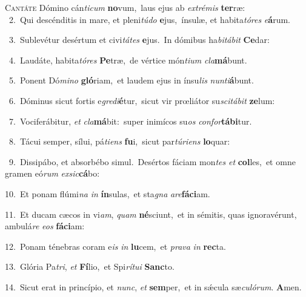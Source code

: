 \lettrine{\initial\textcolor{\initialcolor}{C}}{antáte} Dómino cán\-\textit{ti}\-\textit{cum} \textbf{no}\-vum,~\star laus ejus ab \textit{ex}\-\textit{tré}\textit{mis} \textbf{ter}\-ræ:\\
{\numbfont\textcolor{\numbcolor}{~2.}}~Qui descénditis in mare, et pleni\-\textit{tú}\-\textit{do} \textbf{e}\-jus,~\star ínsulæ, et habita\-\textit{tó}\-\textit{res} \textit{e}\-\textbf{á}rum.\par
{\numbfont\textcolor{\numbcolor}{~3.}}~Sublevétur desértum et civi\-\textit{tá}\-\textit{tes} \textbf{e}\-jus.~\star In dómibus ha\-\textit{bi}\-\textit{tá}\textit{bit} \textbf{Ce}\-dar:\par
{\numbfont\textcolor{\numbcolor}{~4.}}~Laudáte, habita\-\textit{tó}\-\textit{res} \textbf{Pe}\-træ,~\star de vértice món\-\textit{ti}\-\textit{um} \textit{cla}\-\textbf{má}bunt.\par
{\numbfont\textcolor{\numbcolor}{~5.}}~Ponent Dó\-\textit{mi}\-\textit{no} \textbf{gló}\-riam,~\star et laudem ejus in ínsu\textit{lis} \textit{nun}\-\textit{ti}\textbf{á}bunt.\par
{\numbfont\textcolor{\numbcolor}{~6.}}~Dóminus sicut fortis e\-\textit{gre}\-\textit{di}\textbf{é}tur,~\star sicut vir prœliátor su\-\textit{sci}\-\textit{tá}\textit{bit} \textbf{ze}\-lum:\par
{\numbfont\textcolor{\numbcolor}{~7.}}~Vociferábitur, \textit{et} \textit{cla}\-\textbf{má}bit:~\star super inimícos su\textit{os} \textit{con}\-\textit{for}\textbf{tá}\textbf{bi}tur.\par
{\numbfont\textcolor{\numbcolor}{~8.}}~Tácui semper, sílui, pá\-\textit{ti}\-\textit{ens} \textbf{fu}\-i,~\star sicut par\-\textit{tú}\-\textit{ri}\textit{ens} \textbf{lo}\-quar:\par
{\numbfont\textcolor{\numbcolor}{~9.}}~Dissipábo, et absorbébo simul.~\dagger Desértos fáciam mon\textit{tes} \textit{et} \textbf{col}\-les,~\star et omne gramen eó\textit{rum} \textit{ex}\-\textit{sic}\textbf{cá}bo:\par
{\numbfont\textcolor{\numbcolor}{10.}}~Et ponam flúmi\textit{na} \textit{in} \textbf{ín}\-sulas,~\star et sta\textit{gna} \textit{a}\-\textit{re}\textbf{fá}\textbf{ci}am.\par
{\numbfont\textcolor{\numbcolor}{11.}}~Et ducam cæcos in vi\-\textit{am}\-, \textit{quam} \textbf{né}\-sciunt,~\star et in sémitis, quas ignoravérunt, ambulá\textit{re} \textit{e}\-\textit{os} \textbf{fá}\-\textbf{ci}am:\par
{\numbfont\textcolor{\numbcolor}{12.}}~Ponam ténebras coram e\textit{is} \textit{in} \textbf{lu}\-cem,~\star et \textit{pra}\-\textit{va} \textit{in} \textbf{rec}\-ta.\par
{\numbfont\textcolor{\numbcolor}{13.}}~Glória Pa\-\textit{tri}\-, \textit{et} \textbf{Fí}\-lio,~\star et Spi\-\textit{rí}\-\textit{tu}\textit{i} \textbf{Sanc}\-to.\par
{\numbfont\textcolor{\numbcolor}{14.}}~Sicut erat in princípio, et \textit{nunc}\-, \textit{et} \textbf{sem}\-per,~\star et in sǽcula sæ\-\textit{cu}\-\textit{ló}\textit{rum}. \textbf{A}\-men.\par
